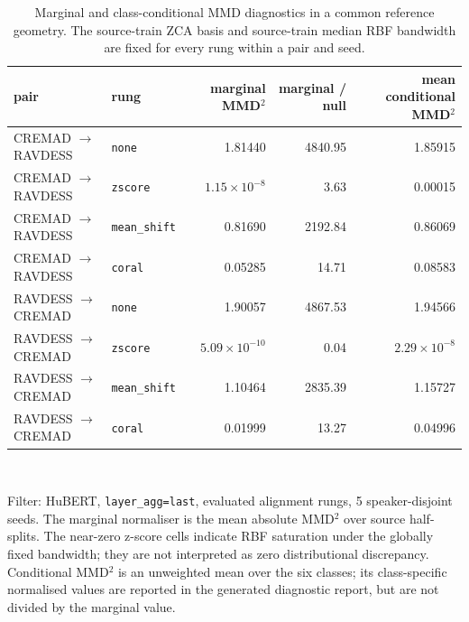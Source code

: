 \begin{table}[!t]
  \centering
  \caption{Marginal and class-conditional MMD diagnostics in a common reference geometry. The source-train ZCA basis and source-train median RBF bandwidth are fixed for every rung within a pair and seed.}
  \label{tab:decomposition}
  \begin{tabular}{llrrr}
    \toprule
    pair & rung & marginal MMD$^2$ & marginal / null & mean conditional MMD$^2$ \\
    \midrule
    CREMAD $\rightarrow$ RAVDESS & \texttt{none} & 1.81440 & 4840.95 & 1.85915 \\
    CREMAD $\rightarrow$ RAVDESS & \texttt{zscore} & $1.15\times10^{-8}$ & 3.63 & 0.00015 \\
    CREMAD $\rightarrow$ RAVDESS & \texttt{mean\_shift} & 0.81690 & 2192.84 & 0.86069 \\
    CREMAD $\rightarrow$ RAVDESS & \texttt{coral} & 0.05285 & 14.71 & 0.08583 \\
    RAVDESS $\rightarrow$ CREMAD & \texttt{none} & 1.90057 & 4867.53 & 1.94566 \\
    RAVDESS $\rightarrow$ CREMAD & \texttt{zscore} & $5.09\times10^{-10}$ & 0.04 & $2.29\times10^{-8}$ \\
    RAVDESS $\rightarrow$ CREMAD & \texttt{mean\_shift} & 1.10464 & 2835.39 & 1.15727 \\
    RAVDESS $\rightarrow$ CREMAD & \texttt{coral} & 0.01999 & 13.27 & 0.04996 \\
    \bottomrule
  \end{tabular}
  \\[2pt]
  \begin{minipage}{\linewidth}\footnotesize Filter: HuBERT, \texttt{layer\_agg=last}, evaluated alignment rungs, 5 speaker-disjoint seeds. The marginal normaliser is the mean absolute MMD$^2$ over source half-splits. The near-zero z-score cells indicate RBF saturation under the globally fixed bandwidth; they are not interpreted as zero distributional discrepancy. Conditional MMD$^2$ is an unweighted mean over the six classes; its class-specific normalised values are reported in the generated diagnostic report, but are not divided by the marginal value.\end{minipage}
\end{table}
